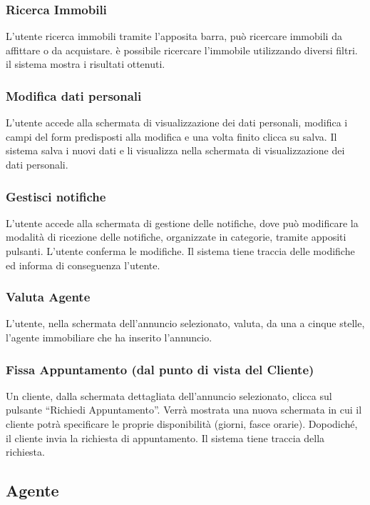 \subsubsection{Ricerca Immobili}
L'utente ricerca immobili tramite l'apposita barra, può ricercare 
immobili da affittare o da acquistare. è possibile ricercare 
l'immobile utilizzando diversi filtri. il sistema mostra i risultati ottenuti.

\subsubsection{Modifica dati personali}
L'utente accede alla schermata di visualizzazione dei dati personali, modifica 
i campi del form predisposti alla modifica e una volta finito clicca su salva. 
Il sistema salva i nuovi dati e li visualizza nella schermata di visualizzazione 
dei dati personali.

\subsubsection{Gestisci notifiche}
L'utente accede alla schermata di gestione delle notifiche, dove
può modificare la modalità di ricezione delle notifiche, organizzate 
in categorie, tramite appositi pulsanti. L'utente conferma le modifiche. 
Il sistema tiene traccia delle modifiche ed informa di conseguenza l'utente.

\subsubsection{Valuta Agente}
L'utente, nella schermata dell'annuncio selezionato, valuta, da una a cinque 
stelle, l'agente immobiliare che ha inserito l'annuncio.

\subsubsection{Fissa Appuntamento (dal punto di vista del Cliente)}
Un cliente, dalla schermata dettagliata dell'annuncio selezionato, clicca sul 
pulsante “Richiedi Appuntamento”. Verrà mostrata una nuova schermata in cui il 
cliente potrà specificare le proprie disponibilità (giorni, fasce orarie). 
Dopodiché, il cliente invia la richiesta di appuntamento. Il sistema tiene
traccia della richiesta.

\subsection{Agente}
